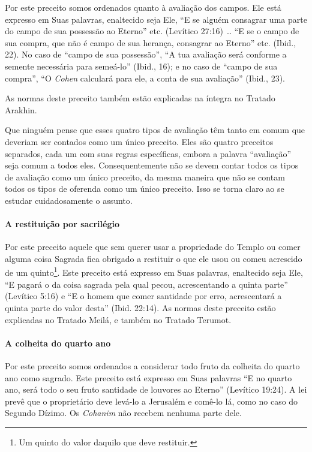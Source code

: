 Por este preceito somos ordenados quanto à avaliação dos campos. Ele
está expresso em Suas palavras, enaltecido seja Ele, ``E se alguém
consagrar uma parte do campo de sua possessão ao Eterno'' etc. (Levítico
27:16) \ldots{} ``E se o campo de sua compra, que não é campo de sua herança,
consagrar ao Eterno'' etc. (Ibid., 22). No caso de ``campo de sua
possessão'', ``A tua avaliação será conforme a semente necessária para
semeá-lo'' (Ibid., 16); e no caso de ``campo de sua compra'', ``O
\textit{Cohen} calculará para ele, a conta de sua avaliação'' (Ibid., 23).

As normas deste preceito também estão explicadas na íntegra no Tratado Arakhin.

Que ninguém pense que esses quatro tipos de avaliação têm tanto em comum
que deveriam ser contados como um único preceito. Eles são quatro
preceitos separados, cada um com suas regras específicas, embora a
palavra ``avaliação'' seja comum a todos eles. Consequentemente não se
devem contar todos os tipos de avaliação como um único preceito, da
mesma maneira que não se contam todos os tipos de oferenda como um único
preceito. Isso se torna claro ao se estudar cuidadosamente o assunto.

\paragraph{A restituição por sacrilégio}

Por este preceito aquele que sem querer usar a propriedade do Templo ou
comer alguma coisa Sagrada fica obrigado a restituir o que ele usou ou
comeu acrescido de um quinto\footnote{Um quinto do valor daquilo que deve restituir.}. Este preceito está
expresso em Suas palavras, enaltecido seja Ele, ``E pagará o da coisa
sagrada pela qual pecou, acrescentando a quinta parte'' (Levítico 5:16)
e ``E o homem que comer santidade por erro, acrescentará a quinta parte
do valor desta'' (Ibid. 22:14). As normas deste preceito estão
explicadas no Tratado Meilá, e também no Tratado Terumot.

\paragraph{A colheita do quarto ano}

Por este preceito somos ordenados a considerar todo fruto da colheita
do quarto ano como sagrado. Este preceito está expresso em Suas
palavras ``E no quarto ano, será todo o seu fruto santidade de louvores
ao Eterno'' (Levítico 19:24). A lei prevê que o proprietário deve
levá-lo a Jerusalém e comê-lo lá, como no caso do Segundo Dízimo. Os
\textit{Cohanim} não recebem nenhuma parte dele.

